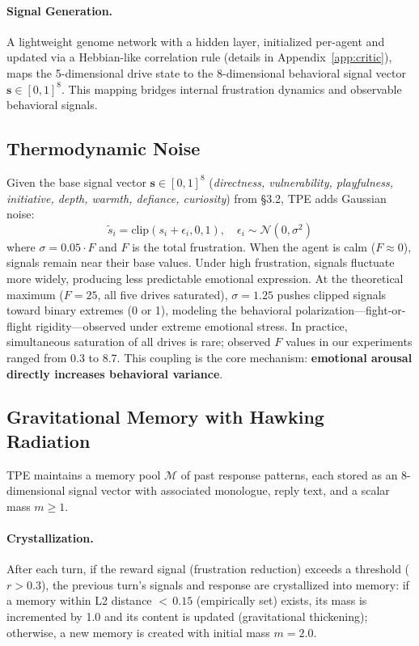 \paragraph{Signal Generation.} A lightweight genome network with a hidden layer, initialized per-agent and updated via a Hebbian-like correlation rule (details in Appendix~\ref{app:critic}), maps the 5-dimensional drive state to the 8-dimensional behavioral signal vector $\mathbf{s} \in [0,1]^8$. This mapping bridges internal frustration dynamics and observable behavioral signals.

\subsection{Thermodynamic Noise}

Given the base signal vector $\mathbf{s} \in [0,1]^8$ (\emph{directness, vulnerability, playfulness, initiative, depth, warmth, defiance, curiosity}) from \S3.2, TPE adds Gaussian noise:
\begin{equation}
    \tilde{s}_i = \text{clip}(s_i + \epsilon_i, 0, 1), \quad \epsilon_i \sim \mathcal{N}(0, \sigma^2)
\end{equation}
where $\sigma = 0.05 \cdot F$ and $F$ is the total frustration. When the agent is calm ($F \approx 0$), signals remain near their base values. Under high frustration, signals fluctuate more widely, producing less predictable emotional expression. At the theoretical maximum ($F = 25$, all five drives saturated), $\sigma = 1.25$ pushes clipped signals toward binary extremes (0 or 1), modeling the behavioral polarization---fight-or-flight rigidity---observed under extreme emotional stress. In practice, simultaneous saturation of all drives is rare; observed $F$ values in our experiments ranged from 0.3 to 8.7. This coupling is the core mechanism: \textbf{emotional arousal directly increases behavioral variance}.

\subsection{Gravitational Memory with Hawking Radiation}

TPE maintains a memory pool $\mathcal{M}$ of past response patterns, each stored as an 8-dimensional signal vector with associated monologue, reply text, and a scalar mass $m \geq 1$.

\paragraph{Crystallization.} After each turn, if the reward signal (frustration reduction) exceeds a threshold ($r > 0.3$), the previous turn's signals and response are crystallized into memory: if a memory within L2 distance ${<}\,0.15$ (empirically set) exists, its mass is incremented by 1.0 and its content is updated (gravitational thickening); otherwise, a new memory is created with initial mass $m = 2.0$.


